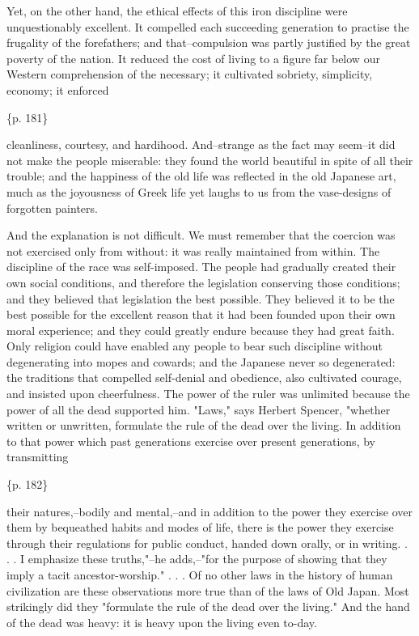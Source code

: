 Yet, on the other hand, the ethical effects of this iron discipline were unquestionably excellent. It compelled each succeeding generation to practise the frugality of the forefathers; and that--compulsion was partly justified by the great poverty of the nation. It reduced the cost of living to a figure far below our Western comprehension of the necessary; it cultivated sobriety, simplicity, economy; it enforced

\{p. 181\}

cleanliness, courtesy, and hardihood. And--strange as the fact may seem--it did not make the people miserable: they found the world beautiful in spite of all their trouble; and the happiness of the old life was reflected in the old Japanese art, much as the joyousness of Greek life yet laughs to us from the vase-designs of forgotten painters.

And the explanation is not difficult. We must remember that the coercion was not exercised only from without: it was really maintained from within. The discipline of the race was self-imposed. The people had gradually created their own social conditions, and therefore the legislation conserving those conditions; and they believed that legislation the best possible. They believed it to be the best possible for the excellent reason that it had been founded upon their own moral experience; and they could greatly endure because they had great faith. Only religion could have enabled any people to bear such discipline without degenerating into mopes and cowards; and the Japanese never so degenerated: the traditions that compelled self-denial and obedience, also cultivated courage, and insisted upon cheerfulness. The power of the ruler was unlimited because the power of all the dead supported him. "Laws," says Herbert Spencer, "whether written or unwritten, formulate the rule of the dead over the living. In addition to that power which past generations exercise over present generations, by transmitting

\{p. 182\}

their natures,--bodily and mental,--and in addition to the power they exercise over them by bequeathed habits and modes of life, there is the power they exercise through their regulations for public conduct, handed down orally, or in writing. . . . I emphasize these truths,"--he adds,--"for the purpose of showing that they imply a tacit ancestor-worship." . . . Of no other laws in the history of human civilization are these observations more true than of the laws of Old Japan. Most strikingly did they "formulate the rule of the dead over the living." And the hand of the dead was heavy: it is heavy upon the living even to-day.

